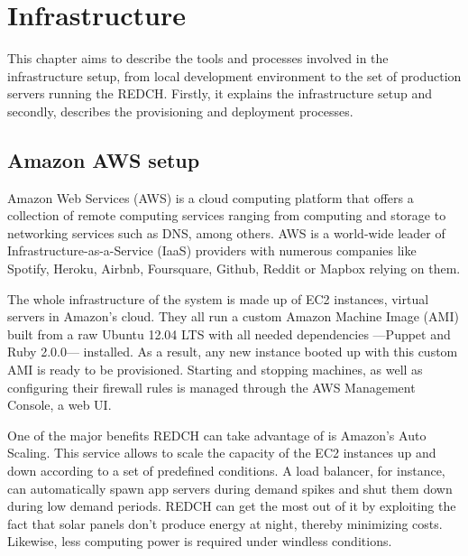 \chapter{Infrastructure}

This chapter aims to describe the tools and processes involved in the infrastructure setup, from local development environment to the set of production servers running the REDCH. Firstly, it explains the infrastructure setup and secondly, describes the provisioning and deployment processes.

\section{Amazon AWS setup}

Amazon Web Services (AWS) is a cloud computing platform that offers a collection of remote computing services ranging from computing and storage to networking services such as DNS, among others. AWS is a world-wide leader of Infrastructure-as-a-Service (IaaS) providers with numerous companies like Spotify, Heroku, Airbnb, Foursquare, Github, Reddit or Mapbox relying on them.

The whole infrastructure of the system is made up of EC2 instances, virtual servers in Amazon's cloud. They all run a custom Amazon Machine Image (AMI) built from a raw Ubuntu 12.04 LTS with all needed dependencies ---Puppet and Ruby 2.0.0--- installed. As a result, any new instance booted up with this custom AMI is ready to be provisioned. Starting and stopping machines, as well as configuring their firewall rules is managed through the AWS Management Console, a web UI.

One of the major benefits REDCH can take advantage of is Amazon's Auto Scaling. This service allows to scale the capacity of the EC2 instances up and down according to a set of predefined conditions. A load balancer, for instance, can automatically spawn app servers during demand spikes and shut them down during low demand periods. REDCH can get the most out of it by exploiting the fact that solar panels don't produce energy at night, thereby minimizing costs. Likewise, less computing power is required under windless conditions.

